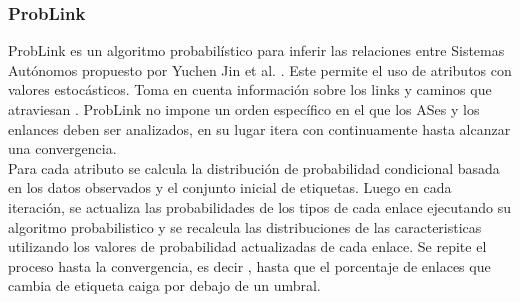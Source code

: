 \subsubsection{ProbLink} \label{sec:anexo_problink}




ProbLink es un algoritmo probabilístico para inferir las relaciones entre Sistemas Autónomos propuesto por Yuchen Jin et al. \cite{ProbLink}. 
Este permite el uso de atributos con valores estocásticos. Toma en cuenta información sobre los links y caminos que atraviesan . ProbLink no impone un orden específico en el que los ASes y los enlances deben ser analizados, en su lugar itera con continuamente hasta alcanzar una convergencia. \\


Para cada atributo se calcula la distribución de probabilidad condicional basada en los datos observados y el conjunto inicial de etiquetas.
Luego en cada iteración, se actualiza las probabilidades de los tipos de cada enlace ejecutando su algoritmo probabilistico y se recalcula las distribuciones de las caracteristicas utilizando los valores de probabilidad actualizadas de cada enlace. 
Se repite el proceso hasta la convergencia, es decir , hasta que el porcentaje de enlaces que cambia de etiqueta caiga por debajo de un umbral.\\

